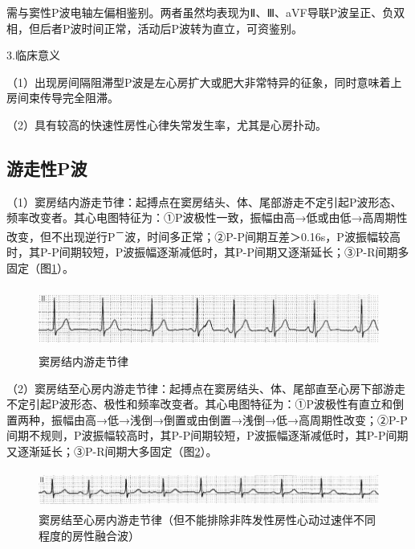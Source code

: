 需与窦性P波电轴左偏相鉴别。两者虽然均表现为Ⅱ、Ⅲ、aVF导联P波呈正、负双相，但后者P波时间正常，活动后P波转为直立，可资鉴别。

3.临床意义

（1）出现房间隔阻滞型P波是左心房扩大或肥大非常特异的征象，同时意味着上房间束传导完全阻滞。

（2）具有较高的快速性房性心律失常发生率，尤其是心房扑动。

\protect\hypertarget{text00007.htmlux5cux23subid12}{}{}

\subsection{游走性P波}

（1）窦房结内游走节律：起搏点在窦房结头、体、尾部游走不定引起P波形态、频率改变者。其心电图特征为：①P波极性一致，振幅由高→低或由低→高周期性改变，但不出现逆行P\textsuperscript{－}波，时间多正常；②P-P间期互差＞0.16s，P波振幅较高时，其P-P间期较短，P波振幅逐渐减低时，其P-P间期又逐渐延长；③P-R间期多固定（图\ref{fig1-12}）。

\begin{figure}[!htbp]
 \centering
 \includegraphics[width=5.78125in,height=0.8125in]{./images/Image00018.jpg}
 \captionsetup{justification=centering}
 \caption{窦房结内游走节律}
 \label{fig1-12}
  \end{figure} 

（2）窦房结至心房内游走节律：起搏点在窦房结头、体、尾部直至心房下部游走不定引起P波形态、极性和频率改变者。其心电图特征为：①P波极性有直立和倒置两种，振幅由高→低→浅倒→倒置或由倒置→浅倒→低→高周期性改变；②P-P间期不规则，P波振幅较高时，其P-P间期较短，P波振幅逐渐减低时，其P-P间期又逐渐延长；③P-R间期大多固定（图\ref{fig1-13}）。

\begin{figure}[!htbp]
 \centering
 \includegraphics[width=5.78125in,height=0.48958in]{./images/Image00019.jpg}
 \captionsetup{justification=centering}
 \caption{窦房结至心房内游走节律（但不能排除非阵发性房性心动过速伴不同程度的房性融合波）}
 \label{fig1-13}
  \end{figure} 

